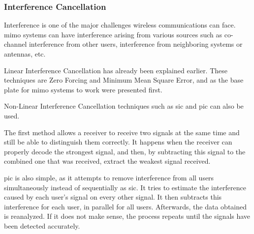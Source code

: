 \subsubsection{Interference Cancellation}
\par Interference is one of the major challenges wireless communications can face. \ac{mimo} systems can have interference arising from various sources such as co-channel interference from other users, interference from neighboring systems or antennas, etc.

\par Linear Interference Cancellation has already been explained earlier. These techniques are Zero Forcing and Minimum Mean Square Error, and as the base plate for \ac{mimo} systems to work were presented first.

\par Non-Linear Interference Cancellation techniques such as \ac{sic} and \ac{pic} can also be used.

\par The first method allows a receiver to receive two signals at the same time and still be able to distinguish them correctly. It happens when the receiver can properly decode the strongest signal, and then, by subtracting this signal to the combined one that was received, extract the weakest signal received.

\par \ac{pic} is also simple, as it attempts to remove interference from all users simultaneously instead of sequentially as \ac{sic}. It tries to estimate the interference caused by each user's signal on every other signal. It then subtracts this interference for each user, in parallel for all users. Afterwards, the data obtained is reanalyzed. If it does not make sense, the process repeats until the signals have been detected accurately\cite{Divsalar1998ImprovedCDMA}.
